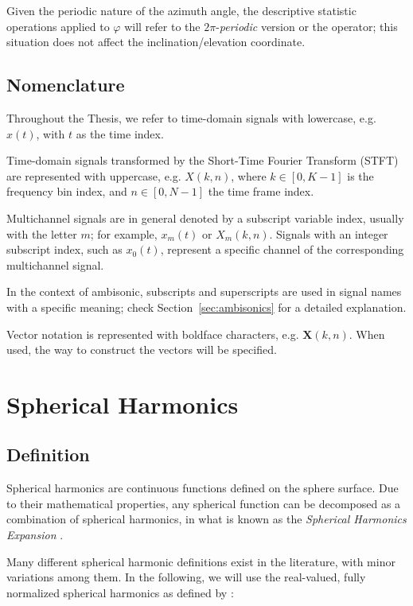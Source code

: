 Given the periodic nature of the azimuth angle, the descriptive statistic operations applied to $\varphi$ will refer to the $2\pi$-\textit{periodic} version or the operator; this situation does not affect the inclination/elevation coordinate.


\subsection{Nomenclature}

Throughout the Thesis, we refer to time-domain signals with lowercase, e.g. $x(t)$, with $t$ as the time index. 

Time-domain signals transformed by the Short-Time Fourier Transform (STFT) are represented with uppercase, e.g. $X(k,n)$, where $k \in [0, K-1]$ is the frequency bin index, and $n \in [0, N-1]$ the time frame index. 

Multichannel signals are in general denoted by a subscript variable index, usually with the letter $m$; for example, $x_m(t)$ or $X_m(k,n)$.
Signals with an integer subscript index, such as $x_0(t)$, represent a specific channel of the corresponding multichannel signal.

In the context of ambisonic, subscripts and superscripts are used in signal names with a specific meaning; check Section~\ref{sec:ambisonics} for a detailed explanation.

Vector notation is represented with boldface characters, e.g. $\bm{X}(k,n)$.  When used, the way to construct the vectors will be specified. 



\section{Spherical Harmonics}

\subsection{Definition}

Spherical harmonics are continuous functions defined on the sphere surface. Due to their mathematical properties, any spherical function can be decomposed as a combination of spherical harmonics, in what is known as the \textit{Spherical Harmonics Expansion} \cite{jarrett2017theory}.




Many different spherical harmonic definitions exist in the literature, with minor variations among them. In the following, we will use the real-valued, fully normalized spherical harmonics as defined by \cite{zotter2019ambisonics}: 

